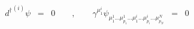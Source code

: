 \begin{equation}
{d^{\dagger}}^{(i)} \psi \;\; =\;\; 0 \quad\quad , \quad\quad \gamma^{\mu^i_1} \psi_{{\mu}^1_1 ...{\mu}^1_{p_1} ...{\mu}^i_1 ...{\mu}^i_{p_i} ... {\mu}^N_{p_N} } \;\; =\;\; 0
\label{eq:3.8b}
\end{equation}


